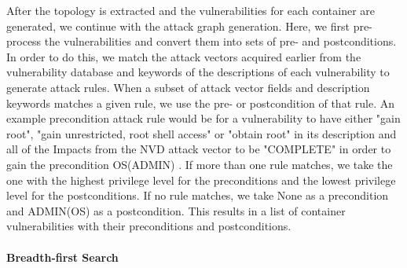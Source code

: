 After the topology  is extracted and the vulnerabilities for each container are generated, we continue with the attack graph generation. Here, we first pre-process the vulnerabilities and convert them into sets of pre- and postconditions. In order to do this, we match the attack vectors acquired earlier from the vulnerability database and keywords of the descriptions of each vulnerability to generate attack rules. When a subset of attack vector fields and description keywords matches a given rule, we use the pre- or postcondition of that rule. An example precondition attack rule would be for a vulnerability to have either "gain root", "gain unrestricted, root shell access" or "obtain root" in its description and all of the Impacts from the NVD attack vector \cite{booth2013national} to be "COMPLETE" in order to gain the precondition OS(ADMIN) \cite{aksu2018automated}. If more than one rule matches, we take the one with the highest privilege level for the preconditions and the lowest privilege level for the postconditions. If no rule matches, we take None as a precondition and ADMIN(OS) as a postcondition. This results in a list of container vulnerabilities with their preconditions and postconditions.

\paragraph{Breadth-first Search}
\label{chap:bfs}


